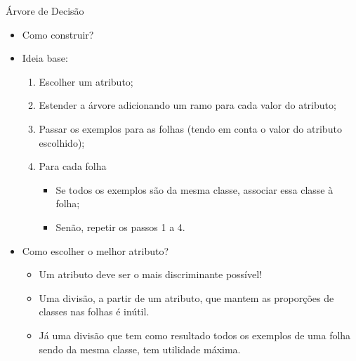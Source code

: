 \documentclass{libs/ufc_format}
\begin{document}
\begin{frame}{Árvore de Decisão}
    \begin{itemize}
        \item<1-9> Como construir?
        \item<2-8> Ideia base:
            \begin{enumerate}
                \justifying
                \item<3-8> Escolher um atributo;
                \item<4-8> Estender a árvore adicionando um ramo para cada valor do atributo;
                \item<5-8> Passar os exemplos para as folhas (tendo em conta o valor do atributo escolhido);
                \item<6-8> Para cada folha
                    \begin{itemize}
                        \justifying
                        \item<7-8> Se todos os exemplos são da mesma classe, associar essa classe à folha;
                        \item<8> Senão, repetir os passos 1 a 4.
                    \end{itemize}
            \end{enumerate}
        \item<9-> Como escolher o melhor atributo?
            \begin{itemize}
                \justifying
                \item<10-> Um atributo deve ser o mais discriminante possível!
                \item<11-> Uma divisão, a partir de um atributo, que mantem as proporções de classes nas folhas é inútil.
                \item<12-> Já uma divisão que tem como resultado todos os exemplos de uma folha sendo da mesma classe, tem utilidade máxima.
            \end{itemize}
    \end{itemize}
\end{frame}
\end{document}
